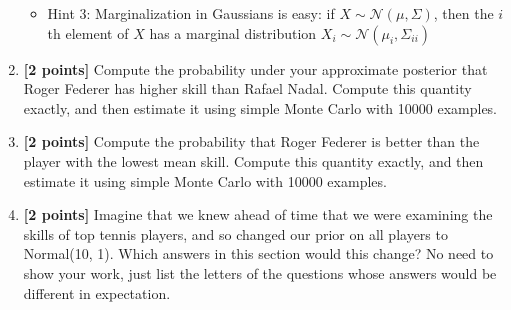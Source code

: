 \documentclass{article}
\begin{document}
\begin{enumerate}[label=(\alph*)]
\begin{itemize}
\item Hint 3: Marginalization in Gaussians is easy: if $X \sim \mathcal{N}(\mu, \Sigma)$, then the $i$th element of $X$ has a marginal distribution $X_i \sim \mathcal{N}(\mu_i, \Sigma_{ii})$ 
\end{itemize}
\item {\bf [2 points]} Compute the probability under your approximate posterior that
	Roger Federer has higher skill than Rafael Nadal.
	Compute this quantity exactly, and then estimate it using simple Monte Carlo with 10000 examples.
\item {\bf [2 points]} Compute the probability that Roger Federer is better than the player
	with the lowest mean skill.
	Compute this quantity exactly, and then estimate it using simple Monte Carlo with 10000 examples.
\item {\bf [2 points]} Imagine that we knew ahead of time that we were examining the
	skills of top tennis players, and so changed our prior on all players to
	Normal(10, 1).
	Which answers in this section would this change?
	No need to show your work, just list the letters of the questions whose answers would be different in expectation.
\end{enumerate}
\end{document}
